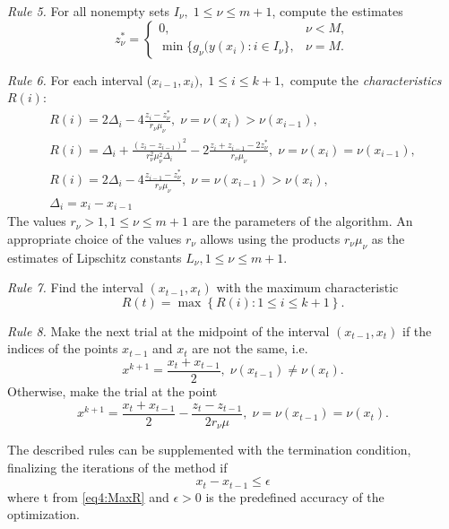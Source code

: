 \documentclass[graybox]{svmult}
\begin{document}
\emph{Rule 5.} For all nonempty sets $I_\nu, \; 1 \leq \nu \leq m+1$, compute the estimates
\begin{equation}
  \label{eq4:mu_const}
  z_\nu^\ast = \left\{
  \begin{array}{lr}
    0, & \nu < M,\\
    \min\{ g_\nu(y(x_i): i\in I_\nu \}, & \nu = M.
  \end{array}
  \right.
\end{equation}

\emph{Rule 6.} For each interval ($x_{i-1},x_i), \; 1 \leq i \leq k+1,$ compute the \textit{characteristics} $R(i)$:
\begin{gather}
  \label{eq4:characteristic}
  R(i)=2\Delta_i-4\frac{z_i-z_\nu^\ast}{r_\nu \mu_\nu}, \; \nu=\nu(x_i)>\nu(x_{i-1}), \nonumber \\
  R(i)=\Delta_i+\frac{(z_i-z_{i-1})^2}{r_\nu^2 \mu_\nu^2\Delta_i}-2\frac{z_i+z_{i-1}-2z_\nu^\ast}{r_\nu \mu_\nu}, \;  \nu=\nu(x_i)=\nu(x_{i-1}),\\
  R(i)=2\Delta_i-4\frac{z_{i-1}-z_\nu^\ast}{r_\nu \mu_\nu}, \; \nu=\nu(x_{i-1})>\nu(x_i), \nonumber \\
  \Delta_i=x_i - x_{i-1} \nonumber
\end{gather}
The values $r_\nu>1, 1\le\nu\le m+1$ are the parameters of the algorithm. An appropriate choice of the values $r_\nu$ allows using the products $r_\nu\mu_\nu$ as the estimates of Lipschitz constants $L_\nu, 1\le\nu\le m+1$.

\emph{Rule 7.} Find the interval $(x_{t-1},x_t)$ with the maximum characteristic
\begin{equation}
\label{eq4:MaxR}
R(t)=\max{\left\{R(i): 1 \leq i \leq k+1\right\}}.
\end{equation}

\emph{Rule 8.} Make the next trial at the midpoint of the interval
$(x_{t-1},x_t)$ if the indices of the points $x_{t-1}$ and $x_t$  are not the same, i.e.
\[
x^{k+1} = \frac{x_t + x_{t-1}}{2}, \; \nu(x_{t-1}) \neq \nu(x_t).
\]
Otherwise, make the trial at the point
\begin{equation}
\label{eq4:next_point}
x^{k+1} = \frac{x_t+x_{t-1}}{2} - \frac{z_t-z_{t-1}}{2r_\nu\mu},\; \nu=\nu(x_{t-1})=\nu(x_t).
\end{equation}

The described rules can be supplemented with the termination condition, finalizing the iterations of the method if
\begin{equation}
\label{eq4:stop_cond}
  x_t - x_{t-1}\le\epsilon
\end{equation}
where t from \eqref{eq4:MaxR} and $\epsilon>0$ is the predefined accuracy of the optimization.
\end{document}

